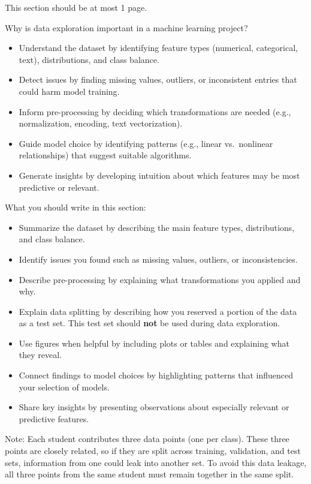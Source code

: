 \documentclass[12pt]{article}
\begin{document}
This section should be at most 1 page. 

Why is data exploration important in a machine learning project?
\begin{itemize}
  \item Understand the dataset by identifying feature types (numerical, categorical, text), distributions, and class balance.  
  \item Detect issues by finding missing values, outliers, or inconsistent entries that could harm model training.  
  \item Inform pre-processing by deciding which transformations are needed (e.g., normalization, encoding, text vectorization).  
  \item Guide model choice by identifying patterns (e.g., linear vs.\ nonlinear relationships) that suggest suitable algorithms.  
  \item Generate insights by developing intuition about which features may be most predictive or relevant.  
\end{itemize}

What you should write in this section:
\begin{itemize}
  \item Summarize the dataset by describing the main feature types, distributions, and class balance.  
  \item Identify issues you found such as missing values, outliers, or inconsistencies.  
  \item Describe pre-processing by explaining what transformations you applied and why.  
  \item Explain data splitting by describing how you reserved a portion of the data as a test set. This test set should \textbf{not} be used during data exploration.  
  \item Use figures when helpful by including plots or tables and explaining what they reveal.  
  \item Connect findings to model choices by highlighting patterns that influenced your selection of models.  
  \item Share key insights by presenting observations about especially relevant or predictive features.  
\end{itemize}

Note: Each student contributes three data points (one per class). These three points are closely related, so if they are split across training, validation, and test sets, information from one could leak into another set. To avoid this data leakage, all three points from the same student must remain together in the same split.
\end{document}
